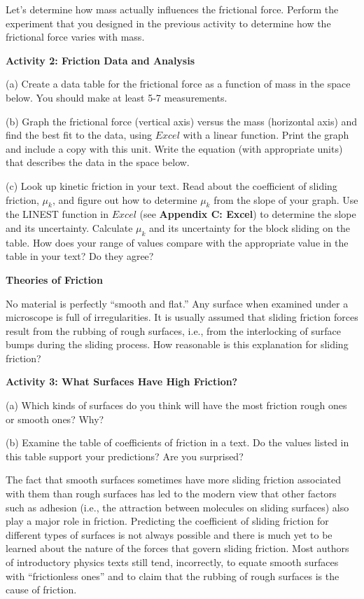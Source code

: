 Let's determine how mass actually influences the frictional force. Perform the
experiment that you designed in the previous activity to determine how the frictional
force varies with mass. 

\newpage

\textbf{Activity 2: Friction Data and Analysis }

(a) Create a data table for the frictional force as a function of mass in the
space below. You should make at least 5-7 measurements. 
\vspace{45mm}

(b) Graph the frictional force (vertical axis) versus the mass (horizontal 
axis) and find the best fit to the data, using $Excel$ with a linear function. 
Print the graph and include a copy with this unit. Write the equation (with 
appropriate units) that describes the data in the space below. 
\vspace{15mm}

(c) Look up kinetic friction in your text. Read about the coefficient
of sliding friction, \( \mu _{k} \), and figure out how to determine 
\( \mu _{k} \) from the slope of your graph. Use the LINEST function in $Excel$ (see \textbf{Appendix C: Excel}) to determine the slope and its uncertainty.  Calculate \( \mu _{k} \) and its uncertainty for the block sliding on
the table. How does your range of values compare with the appropriate value in 
the table in your text? Do they agree?
\vspace{30mm}

\textbf{Theories of Friction} 

No material is perfectly ``smooth and flat.'' Any surface when
examined under a microscope is full of irregularities. It is usually assumed
that sliding friction forces result from the rubbing of rough surfaces, i.e.,
from the interlocking of surface bumps during the sliding process. How reasonable
is this explanation for sliding friction?

\textbf{Activity 3: What Surfaces Have High Friction?} 

(a) Which kinds of surfaces do you think will have the most friction rough ones
or smooth ones? Why?
\vspace{20mm}

(b) Examine the table of coefficients of friction in a text. Do the values listed
in this table support your predictions? Are you surprised? 
\vspace{20mm}

The fact that smooth surfaces sometimes have more sliding friction associated
with them than rough surfaces has led to the modern view that other factors
such as adhesion (i.e., the attraction between molecules on sliding surfaces)
also play a major role in friction. Predicting the coefficient of sliding friction
for different types of surfaces is not always possible and there is much yet
to be learned about the nature of the forces that govern sliding friction. Most
authors of introductory physics texts still tend, incorrectly, to equate smooth
surfaces with ``frictionless ones'' and to claim that the rubbing
of rough surfaces is the cause of friction.

